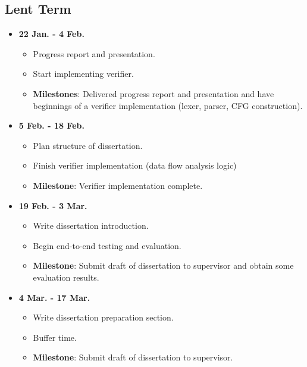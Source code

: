 \documentclass[a4paper, 12pt]{article}
\begin{document}
\subsection{Lent Term}
\begin{itemize}
  \item \textbf{22 Jan. - 4 Feb.}
    \begin{itemize}
      \item Progress report and presentation.
      \item Start implementing verifier.
      \item \textbf{Milestones}: Delivered progress report and presentation and have beginnings of a verifier implementation (lexer, parser, CFG construction).
    \end{itemize}
  \item \textbf{5 Feb. - 18 Feb.}
    \begin{itemize}
      \item Plan structure of dissertation.
      \item Finish verifier implementation (data flow analysis logic)
      \item \textbf{Milestone}: Verifier implementation complete.
    \end{itemize}
  \item \textbf{19 Feb. - 3 Mar.}
    \begin{itemize}
      \item Write dissertation introduction.
      \item Begin end-to-end testing and evaluation.
      \item \textbf{Milestone}: Submit draft of dissertation to supervisor and obtain some evaluation results.
    \end{itemize}
  \item \textbf{4 Mar. - 17 Mar.}
    \begin{itemize}
      \item Write dissertation preparation section.
      \item Buffer time.
      \item \textbf{Milestone}: Submit draft of dissertation to supervisor.
    \end{itemize}
\end{itemize}
\end{document}

